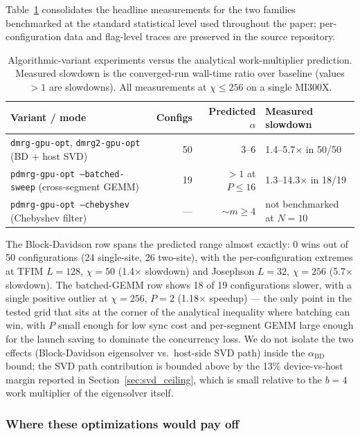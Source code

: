 \documentclass[preprint,12pt]{elsarticle}
\begin{document}
Table~\ref{tab:opt_summary} consolidates the headline measurements for the two families benchmarked at the standard statistical level used throughout the paper; per-configuration data and flag-level traces are preserved in the source repository.

\begin{table}[h]
\centering
\caption{Algorithmic-variant experiments versus the analytical work-multiplier prediction. Measured slowdown is the converged-run wall-time ratio over baseline (values $> 1$ are slowdowns). All measurements at $\chi \le 256$ on a single MI300X.}
\label{tab:opt_summary}
\begin{tabular}{lrrl}
\toprule
Variant / mode & Configs & Predicted $\alpha$ & Measured slowdown \\
\midrule
\texttt{dmrg-gpu-opt}, \texttt{dmrg2-gpu-opt} (BD + host SVD) & 50 & 3--6 & 1.4--5.7$\times$ in 50/50 \\
\texttt{pdmrg-gpu-opt --batched-sweep} (cross-segment GEMM)  & 19 & $> 1$ at $P{\le}16$ & 1.3--14.3$\times$ in 18/19 \\
\texttt{pdmrg-gpu-opt --chebyshev} (Chebyshev filter)        & --- & $\sim m \geq 4$ & not benchmarked at $N{=}10$ \\
\bottomrule
\end{tabular}
\end{table}

The Block-Davidson row spans the predicted range almost exactly: 0 wins out of 50 configurations (24 single-site, 26 two-site), with the per-configuration extremes at TFIM $L{=}128$, $\chi{=}50$ (1.4$\times$ slowdown) and Josephson $L{=}32$, $\chi{=}256$ (5.7$\times$ slowdown).
The batched-GEMM row shows 18 of 19 configurations slower, with a single positive outlier at $\chi{=}256$, $P{=}2$ (1.18$\times$ speedup) --- the only point in the tested grid that sits at the corner of the analytical inequality where batching can win, with $P$ small enough for low sync cost and per-segment GEMM large enough for the launch saving to dominate the concurrency loss.
We do not isolate the two effects (Block-Davidson eigensolver vs.\ host-side SVD path) inside the $\alpha_\text{BD}$ bound; the SVD path contribution is bounded above by the 13\% device-vs-host margin reported in Section~\ref{sec:svd_ceiling}, which is small relative to the $b{=}4$ work multiplier of the eigensolver itself.

\subsubsection{Where these optimizations would pay off}
\label{sec:opt_regime}
\end{document}
